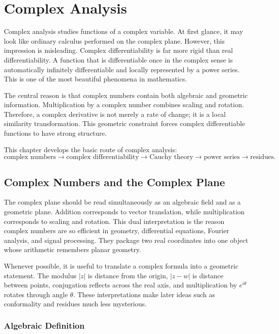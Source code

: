 \chapter{Complex Analysis}

Complex analysis studies functions of a complex variable. At first glance, it may look like ordinary calculus performed on the complex plane. However, this impression is misleading. Complex differentiability is far more rigid than real differentiability. A function that is differentiable once in the complex sense is automatically infinitely differentiable and locally represented by a power series. This is one of the most beautiful phenomena in mathematics.

The central reason is that complex numbers contain both algebraic and geometric information. Multiplication by a complex number combines scaling and rotation. Therefore, a complex derivative is not merely a rate of change; it is a local similarity transformation. This geometric constraint forces complex differentiable functions to have strong structure.

This chapter develops the basic route of complex analysis:
\[
    \text{complex numbers}\to\text{complex differentiability}\to\text{Cauchy theory}\to\text{power series}\to\text{residues}.
\]

\section{Complex Numbers and the Complex Plane}


The complex plane should be read simultaneously as an algebraic field and as a geometric plane. Addition corresponds to vector translation, while multiplication corresponds to scaling and rotation. This dual interpretation is the reason complex numbers are so efficient in geometry, differential equations, Fourier analysis, and signal processing. They package two real coordinates into one object whose arithmetic remembers planar geometry.

Whenever possible, it is useful to translate a complex formula into a geometric statement. The modulus $|z|$ is distance from the origin, $|z-w|$ is distance between points, conjugation reflects across the real axis, and multiplication by $e^{i\theta}$ rotates through angle $\theta$. These interpretations make later ideas such as conformality and residues much less mysterious.

\subsection{Algebraic Definition}

